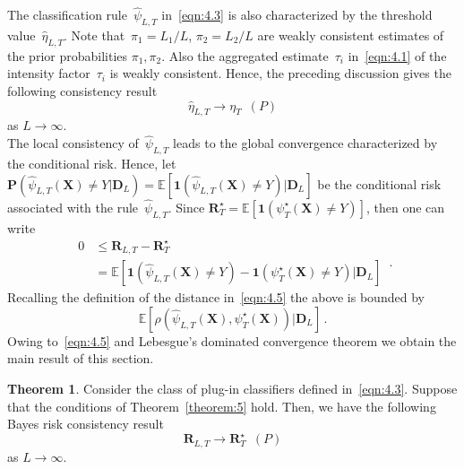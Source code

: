 \documentclass[lettersize,journal,onecolumn]{IEEEtran}
\theoremstyle{definition}
\newtheorem{theorem}{Theorem}
\newcommand{\E}[1]{\mathbb{E}\left[#1\right]}
\newcommand{\indicator}[1]{{\mathbf{1}}\left( #1 \right)}
\begin{document}
The classification rule~$\widehat{\psi}_{L,T}$ in~\eqref{eqn:4.3} is also characterized 
by the threshold value~$\widehat{\eta}_{L,T}$. Note that~$\pi_{1}=L_{1}/L$, 
\enspace$\pi_{2}=L_{2}/L$ are weakly consistent estimates of the prior probabilities
$\pi_{1}, \pi_{2}$. Also the aggregated estimate~$\tau_{i}$ in~\eqref{eqn:4.1} of the 
intensity factor~$\tau_{i}$ is weakly consistent. Hence, the preceding discussion gives 
the following consistency result
\begin{equation}
	\widehat{\eta}_{L,T} \to \eta_{T}
	\enspace (P)
	\label{eqn:4.7}
\end{equation}
as $L\to\infty$.\\
The local consistency of~$\widehat{\psi}_{L,T}$ leads to the global convergence 
characterized by the conditional risk. Hence, let \mbox{$
	\mathbf{P}(
	\widehat{\psi}_{L,T}(\mathbf{X}) \neq Y | \mathbf{D}_{L}
	) = \E{\indicator{
			\widehat{\psi}_{L,T}(\mathbf{X}) \neq Y
		} | \mathbf{D}_{L}}
	$} be the conditional risk associated with the rule~$\widehat{\psi}_{L,T}$.
Since \mbox{$
	\mathbf{R}_{T}^{\star} = 
	\E{\indicator{
			\psi_{T}^{\star}(\mathbf{X}) \neq Y
	}}
	$}, then one can write
\begin{equation*}
	\begin{split}
		0 & \leq \mathbf{R}_{L,T} - \mathbf{R}_{T}^{\star} \\
		& = 
		\E{
			\indicator{\widehat{\psi}_{L,T}(\mathbf{X}) \neq Y} -
			\indicator{\psi_{T}^{\star}(\mathbf{X}) \neq Y}
			| \mathbf{D}_{L}}
	\end{split}
	\,.
\end{equation*}
Recalling the definition of the distance in~\eqref{eqn:4.5} the above is bounded by
\begin{equation*}
	\E{\rho(
		\widehat{\psi}_{L,T}(\mathbf{X}), \psi_{T}^{\star}(\mathbf{X})
		) | \mathbf{D}_{L}
	}
	\,.
\end{equation*}
Owing to~\eqref{eqn:4.5} and Lebesgue's dominated convergence theorem we obtain the 
main result of this section.
\begin{theorem}
	\label{theorem:6}
	Consider the class of plug-in classifiers defined in~\eqref{eqn:4.3}. Suppose that 
	the	conditions of Theorem~\ref{theorem:5} hold. Then, we have the following Bayes
	risk consistency result
	\begin{equation}
		\mathbf{R}_{L,T} \to \mathbf{R}_{T}^{\star}
		\enspace (P)
		\label{eqn:4.8}
	\end{equation}
	as $L\to\infty$.
\end{theorem}
\end{document}
